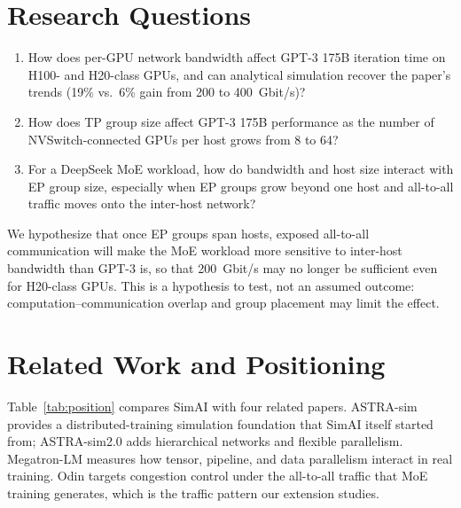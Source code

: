 \documentclass[letterpaper,twocolumn,10pt]{article}
\begin{document}
\section{Research Questions}
\begin{enumerate}[leftmargin=*,itemsep=2pt,topsep=3pt]
\item How does per-GPU network bandwidth affect GPT-3 175B iteration time on H100- and H20-class GPUs, and can analytical simulation recover the paper's trends (19\% vs.\ 6\% gain from 200 to 400~Gbit/s)?
\item How does TP group size affect GPT-3 175B performance as the number of NVSwitch-connected GPUs per host grows from 8 to 64?
\item For a DeepSeek MoE workload, how do bandwidth and host size interact with EP group size, especially when EP groups grow beyond one host and all-to-all traffic moves onto the inter-host network?
\end{enumerate}
We hypothesize that once EP groups span hosts, exposed all-to-all communication will make the MoE workload more sensitive to inter-host bandwidth than GPT-3 is, so that 200~Gbit/s may no longer be sufficient even for H20-class GPUs. This is a hypothesis to test, not an assumed outcome: computation--communication overlap and group placement may limit the effect.

\section{Related Work and Positioning}
Table~\ref{tab:position} compares SimAI with four related papers. ASTRA-sim provides a distributed-training simulation foundation that SimAI itself started from; ASTRA-sim2.0 adds hierarchical networks and flexible parallelism. Megatron-LM measures how tensor, pipeline, and data parallelism interact in real training. Odin targets congestion control under the all-to-all traffic that MoE training generates, which is the traffic pattern our extension studies.
\end{document}

